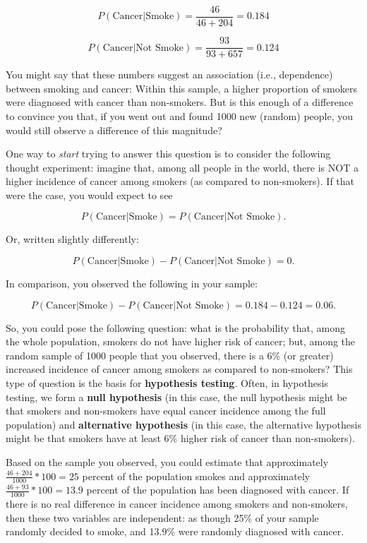\documentclass[
  openany]{book}
\begin{document}
\[P(\text{Cancer}|\text{Smoke})=\frac{46}{46+204}=0.184\]

\[P(\text{Cancer}|\text{Not Smoke})=\frac{93}{93+657}=0.124\]

You might say that these numbers suggest an association (i.e., dependence) between smoking and cancer: Within this sample, a higher proportion of smokers were diagnosed with cancer than non-smokers. But is this enough of a difference to convince you that, if you went out and found 1000 new (random) people, you would still observe a difference of this magnitude?

One way to \emph{start} trying to answer this question is to consider the following thought experiment: imagine that, among all people in the world, there is NOT a higher incidence of cancer among smokers (as compared to non-smokers). If that were the case, you would expect to see

\[P(\text{Cancer}|\text{Smoke})=P(\text{Cancer}|\text{Not Smoke}).\]

Or, written slightly differently:

\[P(\text{Cancer}|\text{Smoke})-P(\text{Cancer}|\text{Not Smoke})=0.\]

In comparison, you observed the following in your sample:

\[P(\text{Cancer}|\text{Smoke})-P(\text{Cancer}|\text{Not Smoke})=0.184-0.124=0.06.\]

So, you could pose the following question: what is the probability that, among the whole population, smokers do not have higher risk of cancer; but, among the random sample of 1000 people that you observed, there is a 6\% (or greater) increased incidence of cancer among smokers as compared to non-smokers? This type of question is the basis for \textbf{hypothesis testing}. Often, in hypothesis testing, we form a \textbf{null hypothesis} (in this case, the null hypothesis might be that smokers and non-smokers have equal cancer incidence among the full population) and \textbf{alternative hypothesis} (in this case, the alternative hypothesis might be that smokers have at least 6\% higher risk of cancer than non-smokers).

Based on the sample you observed, you could estimate that approximately \(\frac{46+204}{1000}*100=25\) percent of the population smokes and approximately \(\frac{46+93}{1000}*100=13.9\) percent of the population has been diagnosed with cancer. If there is no real difference in cancer incidence among smokers and non-smokers, then these two variables are independent: as though 25\% of your sample randomly decided to smoke, and 13.9\% were randomly diagnosed with cancer.
\end{document}
